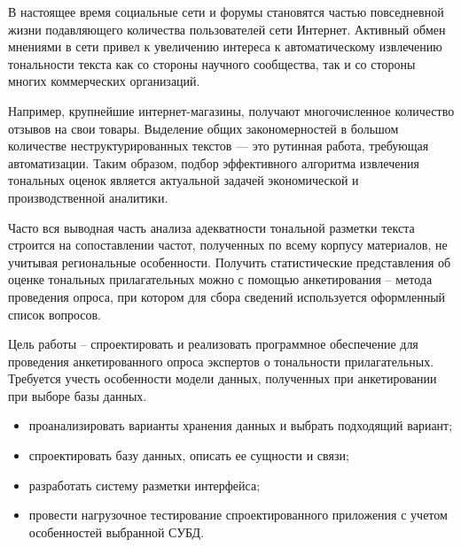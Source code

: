 \setcounter{page}{2}
В настоящее время социальные сети и форумы становятся частью повседневной жизни подавляющего количества пользователей сети Интернет. Активный обмен мнениями в сети привел к увеличению интереса к автоматическому извлечению тональности текста как со стороны научного сообщества, так и со стороны многих коммерческих организаций. 

Например, крупнейшие интернет-магазины, получают многочисленное
количество отзывов на свои товары. Выделение общих закономерностей в большом количестве неструктурированных текстов — это рутинная работа, требующая автоматизации. Таким образом, подбор эффективного алгоритма извлечения тональных оценок является актуальной задачей экономической и производственной аналитики.

Часто вся выводная часть анализа адекватности тональной разметки текста строится на сопоставлении частот, полученных по всему корпусу материалов, не учитывая региональные особенности. Получить статистические представления об оценке тональных прилагательных можно с помощью анкетирования -- метода проведения опроса, при котором для сбора сведений используется оформленный список вопросов.

Цель работы -- спроектировать и реализовать программное обеспечение для проведения анкетированного опроса экспертов о тональности прилагательных. Требуется учесть особенности модели данных, полученных при анкетировании при выборе базы данных.
\begin{itemize}
	\item проанализировать варианты хранения данных и выбрать подходящий вариант;
	\item спроектировать базу данных, описать ее сущности и связи;
	\item разработать систему разметки интерфейса;
	\item провести нагрузочное тестирование спроектированного приложения с учетом особенностей выбранной СУБД.
\end{itemize}

